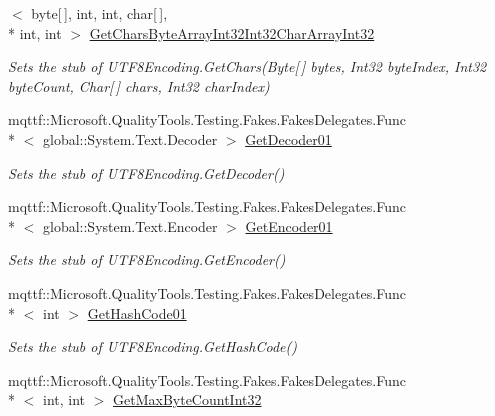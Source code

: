 \begin{DoxyCompactItemize}
$<$ byte\mbox{[}$\,$\mbox{]}, int, int, char\mbox{[}$\,$\mbox{]}, \\*
int, int $>$ \hyperlink{class_system_1_1_text_1_1_fakes_1_1_stub_u_t_f8_encoding_a97767fc36814f5afe6ae7e359b1e42d1}{Get\-Chars\-Byte\-Array\-Int32\-Int32\-Char\-Array\-Int32}
\begin{DoxyCompactList}\small\item\em Sets the stub of U\-T\-F8\-Encoding.\-Get\-Chars(\-Byte\mbox{[}$\,$\mbox{]} bytes, Int32 byte\-Index, Int32 byte\-Count, Char\mbox{[}$\,$\mbox{]} chars, Int32 char\-Index)\end{DoxyCompactList}\item 
mqttf\-::\-Microsoft.\-Quality\-Tools.\-Testing.\-Fakes.\-Fakes\-Delegates.\-Func\\*
$<$ global\-::\-System.\-Text.\-Decoder $>$ \hyperlink{class_system_1_1_text_1_1_fakes_1_1_stub_u_t_f8_encoding_aa01ea553341239e35e46fe19e0023447}{Get\-Decoder01}
\begin{DoxyCompactList}\small\item\em Sets the stub of U\-T\-F8\-Encoding.\-Get\-Decoder()\end{DoxyCompactList}\item 
mqttf\-::\-Microsoft.\-Quality\-Tools.\-Testing.\-Fakes.\-Fakes\-Delegates.\-Func\\*
$<$ global\-::\-System.\-Text.\-Encoder $>$ \hyperlink{class_system_1_1_text_1_1_fakes_1_1_stub_u_t_f8_encoding_aec7e3441cce06fc48948a286916d5e53}{Get\-Encoder01}
\begin{DoxyCompactList}\small\item\em Sets the stub of U\-T\-F8\-Encoding.\-Get\-Encoder()\end{DoxyCompactList}\item 
mqttf\-::\-Microsoft.\-Quality\-Tools.\-Testing.\-Fakes.\-Fakes\-Delegates.\-Func\\*
$<$ int $>$ \hyperlink{class_system_1_1_text_1_1_fakes_1_1_stub_u_t_f8_encoding_a985c103cbfaecc36e1edaa7d7f546d91}{Get\-Hash\-Code01}
\begin{DoxyCompactList}\small\item\em Sets the stub of U\-T\-F8\-Encoding.\-Get\-Hash\-Code()\end{DoxyCompactList}\item 
mqttf\-::\-Microsoft.\-Quality\-Tools.\-Testing.\-Fakes.\-Fakes\-Delegates.\-Func\\*
$<$ int, int $>$ \hyperlink{class_system_1_1_text_1_1_fakes_1_1_stub_u_t_f8_encoding_a19acf68a9293cb30ab5d9f86b8dcb817}{Get\-Max\-Byte\-Count\-Int32}

\end{DoxyCompactItemize}
